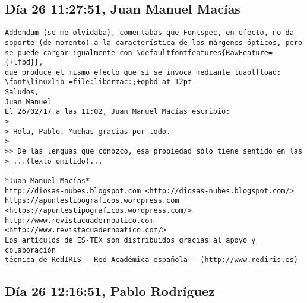 \documentclass[a4paper,10pt]{article}
\begin{document}
\subsection{Día 26 11:27:51, Juan Manuel Macías}

\begin{lstlisting}
Addendum (se me olvidaba), comentabas que Fontspec, en efecto, no da 
soporte (de momento) a la característica de los márgenes ópticos, pero 
se puede cargar igualmente con \defaultfontfeatures{RawFeature={+lfbd}}, 
que produce el mismo efecto que si se invoca mediante luaotfload: 
\font\linuxlib =file:libermac:;+opbd at 12pt
Saludos,
Juan Manuel
El 26/02/17 a las 11:02, Juan Manuel Macías escribió:
>
> Hola, Pablo. Muchas gracias por todo.
>
>> De las lenguas que conozco, esa propiedad sólo tiene sentido en las
> ...(texto omitido)...
-- 
*Juan Manuel Macías*
http://diosas-nubes.blogspot.com <http://diosas-nubes.blogspot.com/>
https://apuntestipograficos.wordpress.com 
<https://apuntestipograficos.wordpress.com/>
http://www.revistacuadernoatico.com <http://www.revistacuadernoatico.com/>
Los artículos de ES-TEX son distribuidos gracias al apoyo y colaboración 
técnica de RedIRIS - Red Académica española - (http://www.rediris.es)

\end{lstlisting}

\subsection{Día 26 12:16:51, Pablo Rodríguez}
\end{document}
